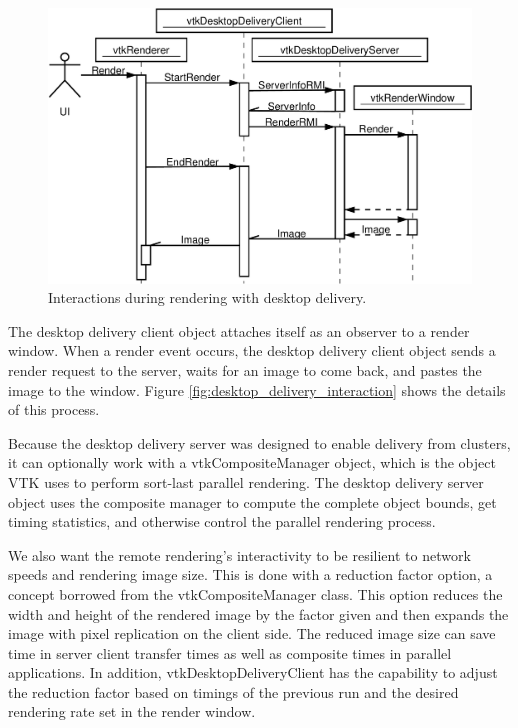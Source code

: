 \documentclass[twocolumn]{article}
\begin{document}
\begin{figure}[ht]
  \begin{center}
    \includegraphics[scale=0.23]{images/DesktopDeliveryInteraction}
    \caption{Interactions during rendering with desktop delivery.}
    \label{fig:desktop_delivery_interaction}
  \end{center}
\end{figure}

The desktop delivery client object attaches itself as an observer to a
render window.  When a render event occurs, the desktop delivery client
object sends a render request to the server, waits for an image to come
back, and pastes the image to the window.  Figure
\vref{fig:desktop_delivery_interaction} shows the details of this process.

Because the desktop delivery server was designed to enable delivery from
clusters, it can optionally work with a vtkCompositeManager object, which
is the object VTK uses to perform sort-last parallel rendering.  The
desktop delivery server object uses the composite manager to compute the
complete object bounds, get timing statistics, and otherwise control the
parallel rendering process.

We also want the remote rendering's interactivity to be resilient to
network speeds and rendering image size.  This is done with a reduction
factor option, a concept borrowed from the vtkCompositeManager class.  This
option reduces the width and height of the rendered image by the factor
given and then expands the image with pixel replication on the client side.
The reduced image size can save time in server client transfer times as
well as composite times in parallel applications.  In addition,
vtkDesktopDeliveryClient has the capability to adjust the reduction factor
based on timings of the previous run and the desired rendering rate set in
the render window.
\end{document}
